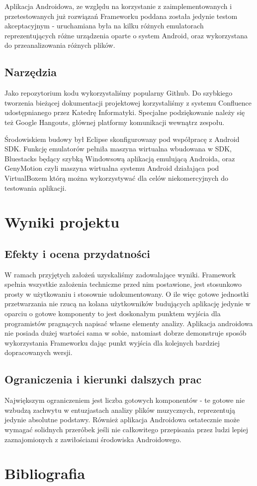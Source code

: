 Aplikacja Androidowa, ze względu na korzystanie z zaimplementowanych i przetestowanych już rozwiązań Frameworku poddana została jedynie testom akceptacyjnym - uruchamiana była na kilku różnych emulatorach reprezentujących różne urządzenia oparte o system Android, oraz wykorzystana do przeanalizowania różnych plików.
\section{Narzędzia}
Jako repozytorium kodu wykorzystaliśmy popularny Github. Do szybkiego tworzenia bieżącej dokumentacji projektowej korzystaliśmy z systemu Confluence udostępnianego przez Katedrę Informatyki. Specjalne podziękowanie należy się też Google Hangouts, głównej platformy komunikacji wewnątrz zespołu.

Środowiskiem budowy był Eclipse skonfigurowany pod współpracę z Android SDK. Funkcję emulatorów pełniła maszyna wirtualna wbudowana w SDK, Bluestacks będący szybką Windowsową aplikacją emulującą Androida, oraz GenyMotion czyli maszyna wirtualna systemu Android działająca pod VirtualBoxem którą można wykorzystywać dla celów niekomercyjnych do testowania aplikacji.

\chapter{Wyniki projektu}
\section{Efekty i ocena przydatności}
W ramach przyjętych założeń uzyskaliśmy zadowalające wyniki. Framework spełnia wszystkie założenia techniczne przed nim postawione, jest stosunkowo prosty w użytkowaniu i stosownie udokumentowany. O ile więc gotowe jednostki przetwarzania nie rzucą na kolana użytkowników budujących aplikację jedynie w oparciu o gotowe komponenty to jest doskonałym punktem wyjścia dla programistów pragnących napisać własne elementy analizy. Aplikacja androidowa nie posiada dużej wartości sama w sobie, natomiast dobrze demonstruje sposób wykorzystania Frameworku dając punkt wyjścia dla kolejnych bardziej dopracowanych wersji.

\section{Ograniczenia i kierunki dalszych prac}
Największym ograniczeniem jest liczba gotowych komponentów - te gotowe nie wzbudzą zachwytu w entuzjastach analizy plików muzycznych, reprezentują jedynie absolutne podstawy. Również aplikacja Androidowa ostatecznie może wymagać solidnych przeróbek jeśli nie całkowitego przepisania przez ludzi lepiej zaznajomionych z zawiłościami środowiska Androidowego.

\chapter{Bibliografia}

\nocite{*}


